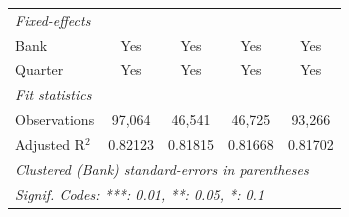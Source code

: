\begin{tabular}{lcccc}
   \midrule
   \emph{Fixed-effects}\\
   Bank                                   & Yes             & Yes            & Yes             & Yes\\  
   Quarter                                & Yes             & Yes            & Yes             & Yes\\  
   \midrule
   \emph{Fit statistics}\\
   Observations                           & 97,064          & 46,541         & 46,725          & 93,266\\  
   Adjusted R$^2$                         & 0.82123         & 0.81815        & 0.81668         & 0.81702\\  
   \midrule \midrule
   \multicolumn{5}{l}{\emph{Clustered (Bank) standard-errors in parentheses}}\\
   \multicolumn{5}{l}{\emph{Signif. Codes: ***: 0.01, **: 0.05, *: 0.1}}\\
\end{tabular}
\par\endgroup



